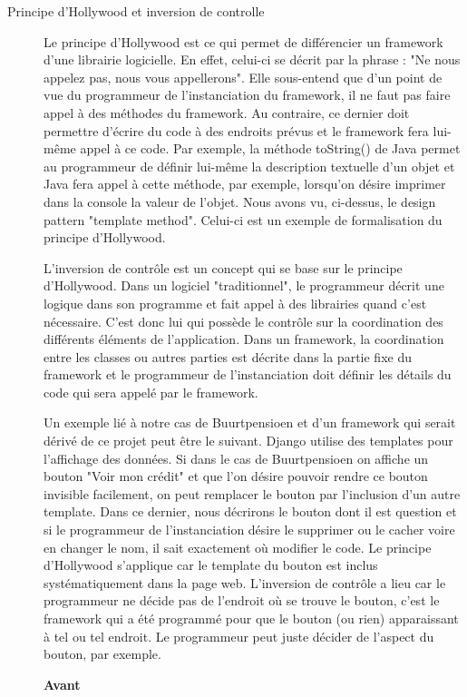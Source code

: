 \begin{description}
\item[Principe d'Hollywood et inversion de controlle]
Le principe d'Hollywood est ce qui permet de différencier un framework d'une librairie logicielle.  En effet,  celui-ci se décrit par la phrase : "Ne nous appelez pas,  nous vous appellerons".  Elle sous-entend que d'un point de vue du programmeur de l'instanciation du framework,   il ne faut pas faire appel à des méthodes du framework.  Au contraire,  ce dernier doit permettre d'écrire du code à des endroits prévus et le framework fera lui-même appel à ce code.  Par exemple,  la méthode toString() de Java permet au programmeur de définir lui-même la description textuelle d'un objet et Java fera appel à cette méthode,  par exemple,  lorsqu'on désire imprimer dans la console la valeur de l'objet.  Nous avons vu,  ci-dessus,  le design pattern "template method".  Celui-ci est un exemple de formalisation du principe d'Hollywood.

L'inversion de contrôle est un concept qui se base sur le principe d'Hollywood.  Dans un logiciel "traditionnel",  le programmeur décrit une logique dans son programme et fait appel à des librairies quand c'est nécessaire.  C'est donc lui qui possède le contrôle sur la coordination des différents éléments de l'application.  Dans un framework,  la coordination entre les classes ou autres parties est décrite dans la partie fixe du framework et le programmeur de l'instanciation doit définir les détails du code qui sera appelé par le framework.  

Un exemple lié à notre cas de Buurtpensioen et d'un framework qui serait dérivé de ce projet peut être le suivant.  Django utilise des templates pour l'affichage des données.  Si dans le cas de Buurtpensioen on affiche un bouton "Voir mon crédit" et que l'on désire pouvoir rendre ce bouton invisible facilement,  on peut remplacer le bouton par l'inclusion d'un autre template.  Dans ce dernier,  nous décrirons le bouton dont il est question et si le programmeur de l'instanciation désire le supprimer ou le cacher voire en changer le nom,  il sait exactement où modifier le code.  Le principe d'Hollywood s'applique car le template du bouton est inclus systématiquement dans la page web.  L'inversion de contrôle a lieu car le programmeur ne décide pas de l'endroit où se trouve le bouton,  c'est le framework qui a été programmé pour que le bouton (ou rien) apparaissant à tel ou tel endroit.   Le programmeur peut juste décider de l'aspect du bouton,  par exemple.
\vspace{0.3cm}
\begin{minipage}{.5\textwidth}
\begin{center} \textbf{Avant}


\end{center}
\end{minipage}
\end{description}
